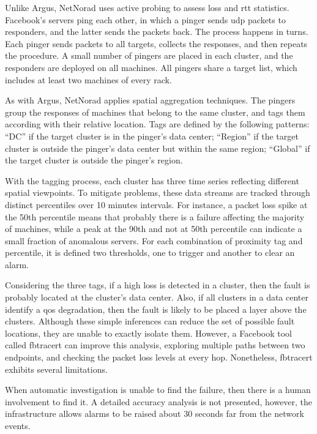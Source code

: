 Unlike Argus, NetNorad uses active probing to assess loss and \gls*{rtt}
statistics.  Facebook's servers ping each other, in which
a pinger sends \gls*{udp} packets to responders, and the latter
sends the packets back. The process happens in turns. Each pinger
sends packets to all targets, collects the responses, and then repeats
the procedure. A small number of pingers are placed in each cluster,
and the responders are
deployed on all machines. All pingers share a target list, which includes
at least two machines of every rack.

As with Argus, NetNorad applies spatial aggregation techniques.
The pingers group the responses of machines that belong to the same cluster,
and tags them according with their relative location.
Tags are defined by the following patterns:
``DC'' if the target cluster is in the pinger's data center;
``Region'' if the target cluster is outside the pinger's
data center but within the same region;
``Global'' if the target cluster is outside the pinger's
region.

With the tagging process, each cluster has three time series reflecting
different spatial viewpoints.
To mitigate problems, these data streams are tracked through
distinct percentiles over 10 minutes intervals.
For instance, a packet loss spike at the
50th percentile means that probably there is a failure affecting the majority of
machines, while a peak at the 90th and not at 50th
percentile can indicate a small fraction of anomalous servers.
For each combination of proximity tag and percentile, it is defined two
thresholds, one to trigger and another to clear an alarm.

Considering the three tags, if a high loss is detected in a cluster,
then the fault is probably located at the cluster's data center.
Also, if all clusters in a data center identify a \gls*{qos} degradation,
then the fault is likely to be placed a layer above the clusters.
Although these simple inferences can reduce the set of possible fault locations,
they are unable to exactly isolate them.
However, a Facebook tool called fbtracert
can improve this analysis, exploring multiple
paths between two endpoints, and checking the
packet loss levels at every hop. Nonetheless, fbtracert exhibits several
limitations.

When automatic investigation is unable to find the failure, then there
is a human involvement to find it. A detailed accuracy analysis is not
presented, however, the infrastructure allows alarms to be raised about 30
seconds far from the network events.

